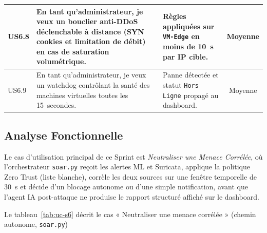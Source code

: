 \begin{xltabular}{\textwidth}{|l|>{\raggedright\arraybackslash}X|>{\raggedright\arraybackslash}X|c|}
US6.8 & En tant qu'administrateur, je veux un bouclier anti-DDoS déclenchable à distance (SYN cookies et limitation de débit) en cas de saturation volumétrique. & Règles appliquées sur \texttt{VM-Edge} en moins de 10~s par IP cible. & Moyenne \\ \hline
US6.9 & En tant qu'administrateur, je veux un watchdog contrôlant la santé des machines virtuelles toutes les 15~secondes. & Panne détectée et statut \texttt{Hors Ligne} propagé au dashboard. & Moyenne \\ \hline

\end{xltabular}

\subsection{Analyse Fonctionnelle}
Le cas d'utilisation principal de ce Sprint est \textit{Neutraliser une Menace Corrélée}, où l'orchestrateur \texttt{soar.py} reçoit les alertes ML et Suricata, applique la politique Zero Trust (liste blanche), corrèle les deux sources sur une fenêtre temporelle de 30~s et décide d'un blocage autonome ou d'une simple notification, avant que l'agent IA post-attaque ne produise le rapport structuré affiché sur le dashboard.

Le tableau~\ref{tab:uc-s6} décrit le cas « Neutraliser une menace corrélée » (chemin autonome, \texttt{soar.py})

